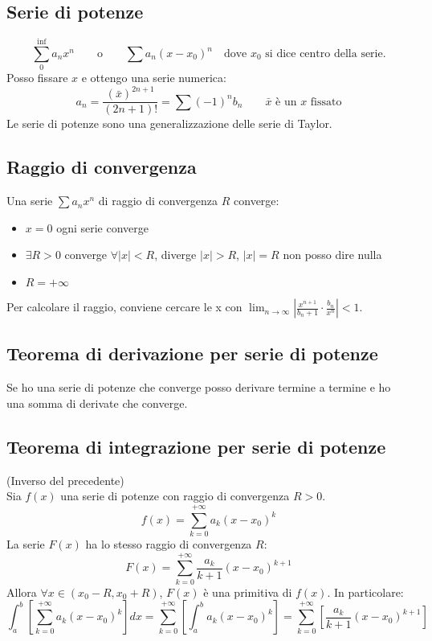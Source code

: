 \documentclass[10pt,a4paper,fleqn]{article}
\begin{document}
	\subsection{Serie di potenze}

	\begin{equation}
	\sum_0^{\inf} a_n x^n\qquad \text{o} \qquad \sum a_n(x-x_0)^n \quad \text{dove $x_0$ si dice centro della serie.}
	\end{equation}
	Posso fissare $x$ e ottengo una serie numerica:
	\begin{equation}
	{a_n}=\frac{(\bar x)^{2n+1}}{(2n+1)!}=\sum(-1)^nb_n \qquad\text{$\bar x$ è un $x$ fissato}
	\end{equation}
	Le serie di potenze sono una generalizzazione delle serie di Taylor.

	\subsection{Raggio di convergenza}

	Una serie $\sum a_nx^n$ di raggio di convergenza $R$ converge:
	\begin{itemize}
	\item $x=0$ ogni serie converge
	\item $\exists R>0$ converge $\forall |x|<R$, diverge $|x|>R$, $|x|=R$ non posso dire nulla
	\item $R=+\infty$
	\end{itemize}
	Per calcolare il raggio, conviene cercare le x con $\lim_{n\to\infty} \left| \frac{x^{n+1}}{b_n + 1}\cdot\frac{b_n}{x^n}\right|<1$.

	\subsection{Teorema di derivazione per serie di potenze}

	Se ho una serie di potenze che converge posso derivare termine a termine e ho una somma di derivate che converge.

	\subsection{Teorema di integrazione per serie di potenze} (Inverso del precedente)\\

	Sia $f(x)$ una serie di potenze con raggio di convergenza $R>0$.
	\begin{equation}
		f(x) = \sum_{k=0}^{+\infty}a_k(x-x_0)^k
	\end{equation}
	La serie $F(x)$ ha lo stesso raggio di convergenza $R$:
	\begin{equation}
		F(x) = \sum_{k=0}^{+\infty}\frac{a_k}{k+1}(x-x_0)^{k+1}
	\end{equation}
	Allora $\forall x \in (x_0 - R, x_0 + R)$, $F(x)$ è una primitiva di $f(x)$. In particolare:
	\begin{equation}
		\int_a^b \left[ \sum_{k=0}^{+\infty}a_k(x-x_0)^k\right] dx = \sum_{k=0}^{+\infty}\left[ \int_a^b a_k(x-x_0)^k\right] = \sum_{k=0}^{+\infty}\left[\frac{a_k}{k+1}(x-x_0)^{k+1}\right]
	\end{equation}
\end{document}
